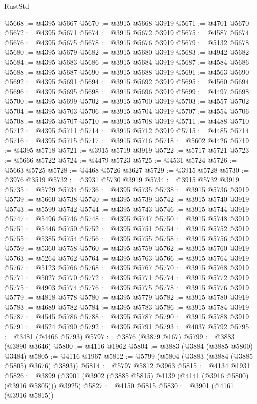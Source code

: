\begin{lexlean}{RustStd}
\begin{coremodule}
@5668 := @4395 @5667
@5670 := @3915 @5668 @3919
@5671 := @4701 @5670
@5672 := @4395 @5671
@5674 := @3915 @5672 @3919
@5675 := @4587 @5674
@5676 := @4395 @5675
@5678 := @3915 @5676 @3919
@5679 := @5132 @5678
@5680 := @4395 @5679
@5682 := @3915 @5680 @3919
@5683 := @4942 @5682
@5684 := @4395 @5683
@5686 := @3915 @5684 @3919
@5687 := @4584 @5686
@5688 := @4395 @5687
@5690 := @3915 @5688 @3919
@5691 := @4563 @5690
@5692 := @4395 @5691
@5694 := @3915 @5692 @3919
@5695 := @4560 @5694
@5696 := @4395 @5695
@5698 := @3915 @5696 @3919
@5699 := @4497 @5698
@5700 := @4395 @5699
@5702 := @3915 @5700 @3919
@5703 := @4557 @5702
@5704 := @4395 @5703
@5706 := @3915 @5704 @3919
@5707 := @4554 @5706
@5708 := @4395 @5707
@5710 := @3915 @5708 @3919
@5711 := @4488 @5710
@5712 := @4395 @5711
@5714 := @3915 @5712 @3919
@5715 := @4485 @5714
@5716 := @4395 @5715
@5717 := @3915 @5716
@5718 := @5602 @4426
@5719 := @4395 @5718
@5721 := @3915 @5719 @3919
@5722 := @5717 @5721
@5723 := @5666 @5722
@5724 := @4479 @5723
@5725 := @4531 @5724
@5726 := @5663 @5725
@5728 := @4468 @5726 @3627
@5729 := @3915 @5728
@5730 := @3976 @3519
@5732 := @3931 @5730 @3919
@5734 := @3915 @5732 @3919
@5735 := @5729 @5734
@5736 := @4395 @5735
@5738 := @3915 @5736 @3919
@5739 := @5660 @5738
@5740 := @4395 @5739
@5742 := @3915 @5740 @3919
@5743 := @5599 @5742
@5744 := @4395 @5743
@5746 := @3915 @5744 @3919
@5747 := @5496 @5746
@5748 := @4395 @5747
@5750 := @3915 @5748 @3919
@5751 := @5446 @5750
@5752 := @4395 @5751
@5754 := @3915 @5752 @3919
@5755 := @5385 @5754
@5756 := @4395 @5755
@5758 := @3915 @5756 @3919
@5759 := @5360 @5758
@5760 := @4395 @5759
@5762 := @3915 @5760 @3919
@5763 := @5264 @5762
@5764 := @4395 @5763
@5766 := @3915 @5764 @3919
@5767 := @5123 @5766
@5768 := @4395 @5767
@5770 := @3915 @5768 @3919
@5771 := @5027 @5770
@5772 := @4395 @5771
@5774 := @3915 @5772 @3919
@5775 := @4903 @5774
@5776 := @4395 @5775
@5778 := @3915 @5776 @3919
@5779 := @4818 @5778
@5780 := @4395 @5779
@5782 := @3915 @5780 @3919
@5783 := @4689 @5782
@5784 := @4395 @5783
@5786 := @3915 @5784 @3919
@5787 := @4545 @5786
@5788 := @4395 @5787
@5790 := @3915 @5788 @3919
@5791 := @4524 @5790
@5792 := @4395 @5791
@5793 := @4037 @5792
@5795 := @3481 (@4466 @5793)
@5797 := @3876 (@3879 @167)
@5799 := @3883 (@3890 @3646)
@5800 := @4116 @1962
@5804 := @3883 (@3884 (@3885 @5800) @3484)
@5805 := @4116 @1967
@5812 := @5799 (@5804 (@3883 (@3884 (@3885 @5805) @3676) @3893))
@5814 := @5797 @5812 @3963
@5815 := @4134 @1931
@5826 := @3899 (@3901 (@3902 (@3885 @5815) @4139 (@4141 (@3916 @5800) (@3916 @5805))) @3925)
@5827 := @4150 @5815
@5830 := @3901 (@4161 (@3916 @5815))

\end{coremodule}
\end{lexlean}
